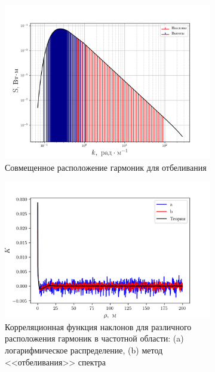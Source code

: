 \begin{figure}[h!]
    \begin{subfigure}{0.49\linewidth}
        \includegraphics[width=\linewidth]{fig/fig3}
        \caption{Совмещенное расположение гармоник для отбеливания}
    \end{subfigure}
    \begin{subfigure}{0.49\linewidth}
        \includegraphics[width=\linewidth]{fig/water/whitening}
        \caption{Корреляционная функция наклонов для различного расположения
        гармоник в частотной области: (a) логарифмическое распределение, (b)
    метод <<отбеливания>> спектра}
    \end{subfigure}
    \caption{}
    \label{fig:14}
\end{figure}

